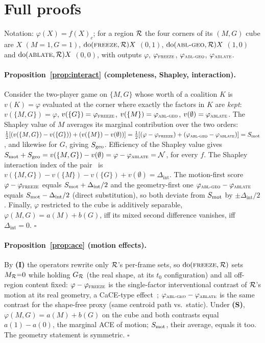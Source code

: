 \section{Full proofs}
\label{supp:proofs}
Notation: $\varphi(X)=f(X)_c$; for a region $\mathcal{R}$ the four corners of its $(M,G)$ cube are $X$ $(M{=}1,G{=}1)$, $\mathrm{do}(\textsc{freeze},\mathcal{R})X$ $(0,1)$, $\mathrm{do}(\textsc{abl-geo},\mathcal{R})X$ $(1,0)$ and $\mathrm{do}(\textsc{ablate},\mathcal{R})X$ $(0,0)$, with outputs $\varphi$, $\varphi_{\textsc{freeze}}$, $\varphi_{\textsc{abl-geo}}$, $\varphi_{\textsc{ablate}}$.

\paragraph{Proposition~\ref{prop:interact} (completeness, Shapley, interaction).}
Consider the two-player game on $\{M,G\}$ whose worth of a coalition $K$ is $v(K)=\varphi$ evaluated at the corner where exactly the factors in $K$ are \emph{kept}: $v(\{M,G\})=\varphi$, $v(\{G\})=\varphi_{\textsc{freeze}}$, $v(\{M\})=\varphi_{\textsc{abl-geo}}$, $v(\emptyset)=\varphi_{\textsc{ablate}}$. The Shapley value of $M$ averages its marginal contribution over the two orders: $\tfrac12[(v(\{M,G\})-v(\{G\}))+(v(\{M\})-v(\emptyset))]=\tfrac12[(\varphi-\varphi_{\textsc{freeze}})+(\varphi_{\textsc{abl-geo}}-\varphi_{\textsc{ablate}})]=S_{\mathrm{mot}}$, and likewise for $G$, giving $S_{\mathrm{geo}}$. Efficiency of the Shapley value gives $S_{\mathrm{mot}}+S_{\mathrm{geo}}=v(\{M,G\})-v(\emptyset)=\varphi-\varphi_{\textsc{ablate}}=\mathcal{N}$, for every $f$. The Shapley interaction index of the pair~\cite{grabisch1999interaction} is $v(\{M,G\})-v(\{M\})-v(\{G\})+v(\emptyset)=\Delta_{\mathrm{int}}$. The motion-first score $\varphi-\varphi_{\textsc{freeze}}$ equals $S_{\mathrm{mot}}+\Delta_{\mathrm{int}}/2$ and the geometry-first one $\varphi_{\textsc{abl-geo}}-\varphi_{\textsc{ablate}}$ equals $S_{\mathrm{mot}}-\Delta_{\mathrm{int}}/2$ (direct substitution), so both deviate from $S_{\mathrm{mot}}$ by $\pm\Delta_{\mathrm{int}}/2$. Finally, $\varphi$ restricted to the cube is additively separable, $\varphi(M,G)=a(M)+b(G)$, iff its mixed second difference vanishes, \ie iff $\Delta_{\mathrm{int}}=0$. $\square$

\paragraph{Proposition~\ref{prop:ace} (motion effects).}
By \textbf{(I)} the operators rewrite only $\mathcal{R}$'s per-frame sets, so $\mathrm{do}(\textsc{freeze},\mathcal{R})$ sets $M_{\mathcal{R}}{=}0$ while holding $G_{\mathcal{R}}$ (the real shape, at its $t_0$ configuration) and all off-region content fixed: $\varphi-\varphi_{\textsc{freeze}}$ is the single-factor interventional contrast of $\mathcal{R}$'s motion at its real geometry, a CaCE-type effect~\cite{goyal2019cace}; $\varphi_{\textsc{abl-geo}}-\varphi_{\textsc{ablate}}$ is the same contrast for the shape-free proxy (same centroid path vs.\ static). Under \textbf{(S)}, $\varphi(M,G)=a(M)+b(G)$ on the cube and both contrasts equal $a(1)-a(0)$, the marginal ACE of motion; $S_{\mathrm{mot}}$, their average, equals it too. The geometry statement is symmetric. $\square$

